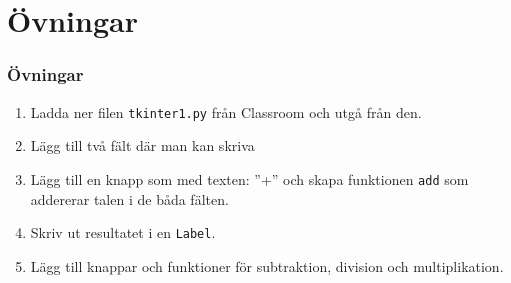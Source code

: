 \documentclass[aspectratio=169]{beamer}
\begin{document}
\section{Övningar}

\begin{frame}
\frametitle{Övningar}

\begin{enumerate}
	\item Ladda ner filen \texttt{tkinter1.py} från Classroom och utgå från den.
	\item Lägg till två fält där man kan skriva
	\item Lägg till en knapp som med texten: ''+'' och skapa funktionen \texttt{add} som addererar talen i de båda fälten.
	\item Skriv ut resultatet i en \texttt{Label}.
	\item Lägg till knappar och funktioner för subtraktion, division och multiplikation.
\end{enumerate}
\end{frame}
\end{document}
